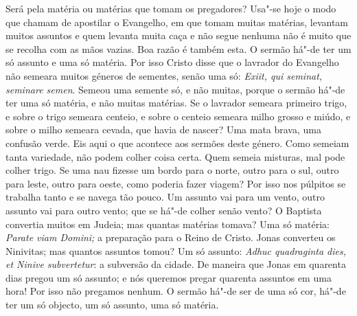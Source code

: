 Será pela matéria ou matérias que tomam os pregadores? Usa"-se hoje o
modo que chamam de apostilar o Evangelho, em que tomam muitas matérias,
levantam muitos assuntos e quem levanta muita caça e não segue nenhuma
não é muito que se recolha com as mãos vazias. Boa razão é também esta.
O sermão há"-de ter um só assunto e uma só matéria. Por isso Cristo disse
que o lavrador do Evangelho não semeara muitos géneros de sementes,
senão uma só: \emph{Exiit, qui seminat, seminare semen}. Semeou uma
semente só, e não muitas, porque o sermão há"-de ter uma só matéria, e
não muitas matérias. Se o lavrador semeara primeiro trigo, e sobre o
trigo semeara centeio, e sobre o centeio semeara milho grosso e miúdo, e
sobre o milho semeara cevada, que havia de nascer? Uma mata brava,
uma confusão verde. Eis aqui o que acontece aos sermões deste género.
Como semeiam tanta variedade, não podem colher coisa certa. Quem semeia
misturas, mal pode colher trigo. Se uma nau fizesse um bordo para o
norte, outro para o sul, outro para leste, outro para oeste, como
poderia fazer viagem? Por isso nos púlpitos se trabalha tanto e se
navega tão pouco. Um assunto vai para um vento, outro assunto vai para
outro vento; que se há"-de colher senão vento? O Baptista convertia
muitos em Judeia; mas quantas matérias tomava? Uma só matéria:
\emph{Parate viam Domini;} a preparação para o Reino de Cristo. Jonas
converteu os Ninivitas; mas quantos assuntos tomou? Um só assunto:
\emph{Adhuc quadraginta dies, et Ninive subvertetur}: a subversão da
cidade. De maneira que Jonas em quarenta dias pregou um só assunto; e
nós queremos pregar quarenta assuntos em uma hora! Por isso não pregamos
nenhum. O sermão há"-de ser de uma só cor, há"-de ter um só objecto, um só
assunto, uma só matéria.

